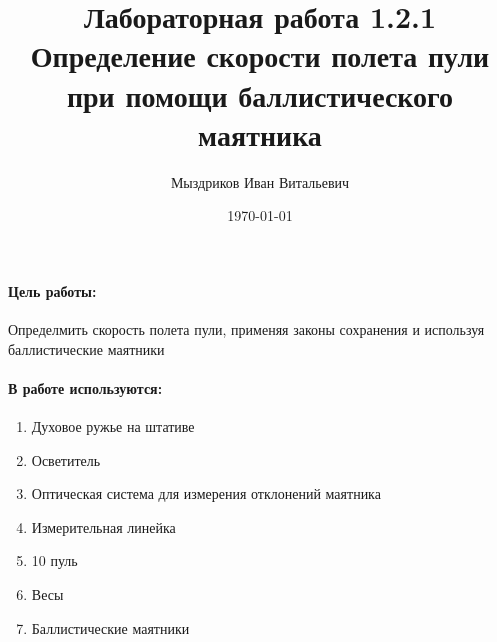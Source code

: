 \documentclass[a4paper, 10pt]{article}%
\author{Мыздриков Иван Витальевич}
\title{Лабораторная работа 1.2.1\\
	Определение скорости полета пули при помощи баллистического маятника}
\date{\today}
\begin{document}
	\maketitle
	\paragraph {Цель работы:}
		Определмить скорость полета пули, применяя законы сохранения и используя баллистические маятники
	\paragraph{В работе используются:}
	\begin{enumerate}
		\item Духовое ружье на штативе
		\item Осветитель
		\item Оптическая система для измерения отклонений маятника
		\item Измерительная линейка
		\item 10 пуль
		\item Весы
		\item Баллистические маятники
	\end{enumerate}
\end{document}
